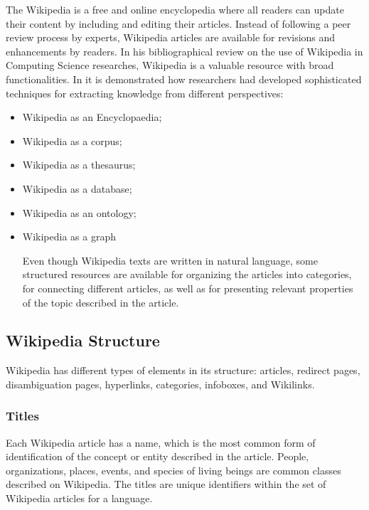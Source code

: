 The Wikipedia is a free and online encyclopedia where all readers can update their content by including and editing their articles. Instead of following a peer review process by experts, Wikipedia articles are available for revisions and enhancements by readers. In his bibliographical review on the use of Wikipedia in Computing Science researches,  Wikipedia is a  valuable resource with broad functionalities.  In \cite{medelyan2009mining} it is demonstrated how researchers had developed sophisticated techniques for extracting knowledge from different perspectives:



\begin{itemize}
\item Wikipedia as an Encyclopaedia; 


\item Wikipedia as a corpus; 
\item Wikipedia as a thesaurus; 
\item Wikipedia as a database; 
\item Wikipedia as an ontology; 
\item Wikipedia as a graph


Even though Wikipedia texts are written in natural language, some structured resources are available for organizing the articles into categories, for connecting different articles, as well as for presenting relevant properties of the topic described in the article.

\end{itemize}
\subsection{\hspace*{3pt}Wikipedia Structure}

Wikipedia has different types of elements in its structure: articles, redirect pages, disambiguation pages, hyperlinks, categories, infoboxes, and Wikilinks. 

\subsubsection{\hspace*{3pt}Titles}
Each Wikipedia article has a name, which is the most common form of identification of the concept or entity described in the article.  People, organizations, places, events, and species of living beings are common classes described on Wikipedia. The titles are unique identifiers within the set of Wikipedia articles for a language.

